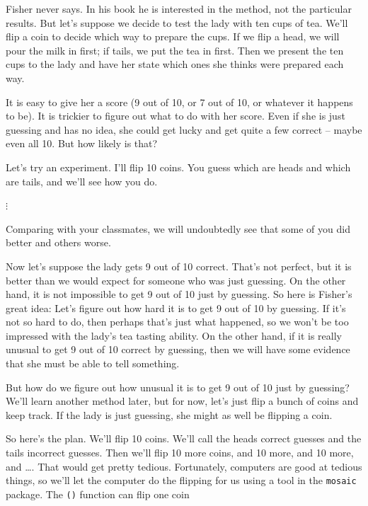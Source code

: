 \documentclass[twoside]{book}
\newcommand{\Rindex}[1]{\index{\texttt{#1}}}
\newcommand{\function}[1]{{\color{purple!75!blue}\texttt{\StrSubstitute{#1}{()}{}()}}\Rindex{#1}}
\newcommand{\pkg}[1]{{\color{red!80!black}\texttt{#1}}\Rindex{#1}}
\def\R{{\sf R}}
\begin{document}
Fisher never says.  In his book he is interested in the method, not the 
particular results.  But let's suppose we decide to test the lady with
ten cups of tea.  
We'll flip a coin to decide which way to prepare the cups.  
If we flip a head, we will pour the milk in first; if tails, we 
put the tea in first.
Then we present the ten cups to the lady and have her state which ones she
thinks were prepared each way.  

It is easy to give her a score (9 out of 10, or 7 out of 10, or whatever
it happens to be).  It is trickier to figure out what to do with her score.
Even if she is just guessing and has no idea, she could get lucky and 
get quite a few correct -- maybe even all 10.  But how likely is that?

Let's try an experiment.  I'll flip 10 coins.  You guess which are heads and
which are tails, and we'll see how you do.  

$\vdots$

Comparing with your classmates, we will undoubtedly see that some 
of you did better and others worse.

Now let's suppose the lady gets 9 out of 10 correct.  That's not perfect,
but it is better than we would expect for someone who was just guessing.
On the other hand, it is not impossible to get 9 out of 10 just by guessing.
So here is Fisher's great idea:  Let's figure out how hard it is to get
9 out of 10 by guessing.  If it's not so hard to do, then perhaps that's 
just what happened, so we won't be too impressed with the lady's tea tasting
ability.  On the other hand, if it is really unusual to get 9 out of 10 
correct by guessing, then we will have some evidence that she must 
be able to tell something.

But how do we figure out how unusual it is to get 9 out of 10 just by 
guessing?  We'll learn another method later, but for now, let's just 
flip a bunch of coins and keep track.  If the lady is just guessing, she 
might as well be flipping a coin.

So here's the plan.  We'll flip 10 coins.  We'll call the heads correct 
guesses and the tails incorrect guesses.  Then we'll flip 10 more coins,
and 10 more, and 10 more, and \dots.  That would get pretty tedious.
Fortunately, computers are good at tedious things, so we'll let the computer 
do the flipping for us using a tool in the \pkg{mosaic} package.
The \function{rflip()} function can flip one coin
\end{document}
